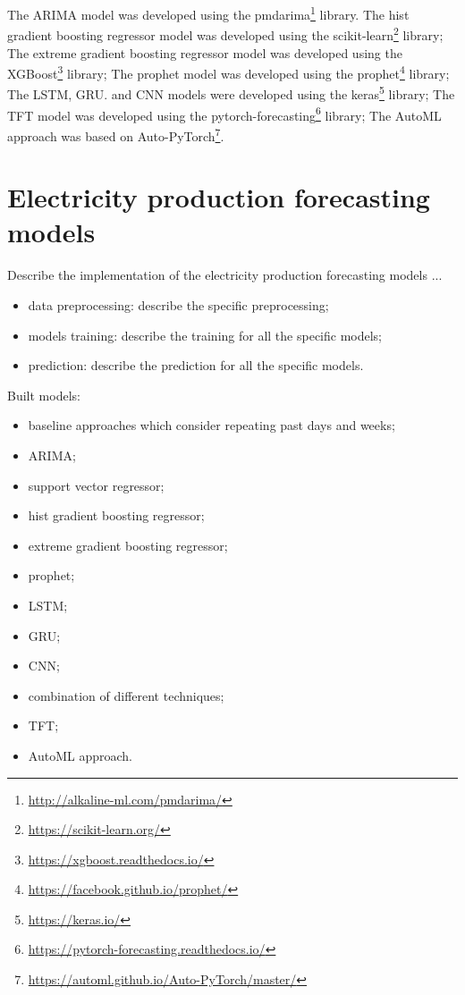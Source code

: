 The ARIMA model was developed using the pmdarima\footnote{ \url{http://alkaline-ml.com/pmdarima/} } library.
The hist gradient boosting regressor model was developed using the scikit-learn\footnote{ \url{https://scikit-learn.org/} } library;
The extreme gradient boosting regressor model was developed using the XGBoost\footnote{ \url{https://xgboost.readthedocs.io/} } library;
The prophet model was developed using the prophet\footnote{ \url{https://facebook.github.io/prophet/} } library;
The LSTM, GRU. and CNN models were developed using the keras\footnote{ \url{https://keras.io/} } library;
The TFT model was developed using the pytorch-forecasting\footnote{ \url{https://pytorch-forecasting.readthedocs.io/} } library;
The AutoML approach was based on Auto-PyTorch\footnote{ \url{https://automl.github.io/Auto-PyTorch/master/} }.


\section{Electricity production forecasting models}
\label{sec:productionimpl}
\vspace{0.2 cm}

Describe the implementation of the electricity production forecasting models ...
\begin{itemize}
  \item data preprocessing: describe the specific preprocessing;
  \item models training: describe the training for all the specific models;
  \item prediction: describe the prediction for all the specific models.
\end{itemize}

Built models:
\begin{itemize}
  \item baseline approaches which consider repeating past days and weeks;
  \item ARIMA;
  \item support vector regressor;
  \item hist gradient boosting regressor;
  \item extreme gradient boosting regressor;
  \item prophet;
  \item LSTM;
  \item GRU;
  \item CNN;
  \item combination of different techniques;
  \item TFT;
  \item AutoML approach.
\end{itemize}

